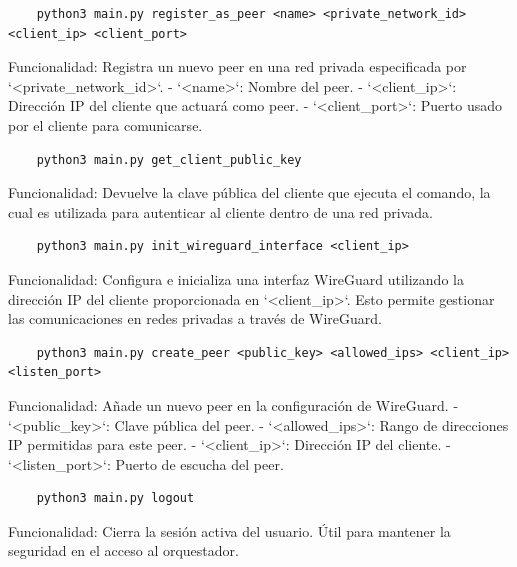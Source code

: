 \begin{verbatim}
    python3 main.py register_as_peer <name> <private_network_id> <client_ip> <client_port>
    \end{verbatim}
    Funcionalidad:  
    Registra un nuevo peer en una red privada especificada por `<private_network_id>`.  
    - `<name>`: Nombre del peer.
    - `<client_ip>`: Dirección IP del cliente que actuará como peer.
    - `<client_port>`: Puerto usado por el cliente para comunicarse.
    
   
    
    \begin{verbatim}
    python3 main.py get_client_public_key
    \end{verbatim}
    Funcionalidad:  
    Devuelve la clave pública del cliente que ejecuta el comando, la cual es utilizada para autenticar al cliente dentro de una red privada.
    
   
    
    \begin{verbatim}
    python3 main.py init_wireguard_interface <client_ip>
    \end{verbatim}
    Funcionalidad:  
    Configura e inicializa una interfaz WireGuard utilizando la dirección IP del cliente proporcionada en `<client_ip>`. Esto permite gestionar las comunicaciones en redes privadas a través de WireGuard.
    
   
    
    \begin{verbatim}
    python3 main.py create_peer <public_key> <allowed_ips> <client_ip> <listen_port>
    \end{verbatim}
    Funcionalidad:  
    Añade un nuevo peer en la configuración de WireGuard.  
    - `<public_key>`: Clave pública del peer.
    - `<allowed_ips>`: Rango de direcciones IP permitidas para este peer.
    - `<client_ip>`: Dirección IP del cliente.
    - `<listen_port>`: Puerto de escucha del peer.
    
   
    
    \begin{verbatim}
    python3 main.py logout
    \end{verbatim}
    Funcionalidad:  
    Cierra la sesión activa del usuario. Útil para mantener la seguridad en el acceso al orquestador.
    
